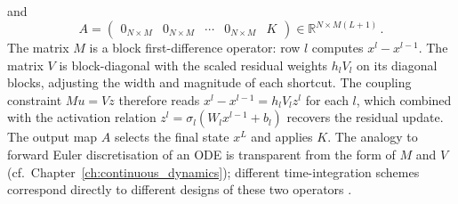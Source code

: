 and
\begin{equation*}
    A = \begin{pmatrix} 0_{N \times M} & 0_{N \times M} & \cdots & 0_{N \times M} & K \end{pmatrix} \in \mathbb{R}^{N \times M(L+1)} \, .
\end{equation*}
The matrix $M$ is a block first-difference operator: row $l$ computes $x^l - x^{l-1}$. The matrix $V$ is block-diagonal with the scaled residual weights $h_l V_l$ on its diagonal blocks, adjusting the width and magnitude of each shortcut. The coupling constraint $Mu = Vz$ therefore reads $x^l - x^{l-1} = h_l V_l z^l$ for each $l$, which combined with the activation relation $z^l = \sigma_l(W_l x^{l-1} + b_l)$ recovers the residual update. The output map $A$ selects the final state $x^L$ and applies $K$. The analogy to forward Euler discretisation of an ODE is transparent from the form of $M$ and $V$ (cf.\ Chapter~\ref{ch:continuous_dynamics}); different time-integration schemes correspond directly to different designs of these two operators \cite{benning2019deep}.

